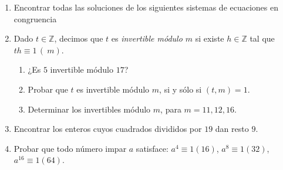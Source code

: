 \documentclass[a4paper,12pt,twoside,spanish,reqno]{amsbook}
\numberwithin{equation}{section}
\begin{document}
\begin{enumerate}
\item Encontrar todas las soluciones de los siguientes sistemas de ecuaciones en congruencia 



\item Dado $t \in {\mathbb Z}$, decimos que $t$ es {\it invertible módulo $m$} si existe $h \in {\mathbb Z}$ tal que $th\equiv 1\,(\ m)$.
    \begin{enumerate}
        \item ¿Es $5$ invertible módulo $17$?
        \item Probar que $t$ es invertible módulo $m$, si y sólo si $(t,m)=1$.
        \item Determinar los invertibles módulo $m$, para $m=11,12,16$.
    \end{enumerate}



\item Encontrar los enteros cuyos cuadrados divididos por $19$ dan resto $9$.


\item Probar que todo número impar $a$ satisface: $a^4 \equiv 1(16)$, $a^8 \equiv 1(32)$, $a^{16}\equiv 1(64)$. 


\end{enumerate}
\end{document}
